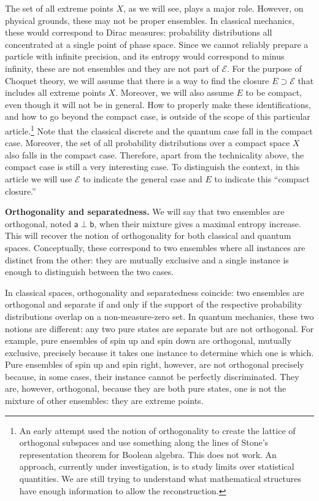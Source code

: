 \documentclass[10pt,twocolumn, nofootinbib]{revtex4-2}
\newcommand{\ens}[1][e] {\mathsf{#1}} %
\newcommand{\Ens}[1][E] {\mathcal{#1}} %
\def\ortho{\perp}
\begin{document}
The set of all extreme points $X$, as we will see, plays a major role. However, on physical grounds, these may not be proper ensembles. In classical mechanics, these would correspond to Dirac measures: probability distributions all concentrated at a single point of phase space. Since we cannot reliably prepare a particle with infinite precision, and its entropy would correspond to minus infinity, these are not ensembles and they are not part of $\Ens$. For the purpose of Choquet theory, we will assume that there is a way to find the closure $E \supset \Ens$ that includes all extreme points $X$. Moreover, we will also assume $E$ to be compact, even though it will not be in general. How to properly make these identifications, and how to go beyond the compact case, is outside of the scope of this particular article.\footnote{An early attempt used the notion of orthogonality to create the lattice of orthogonal subspaces and use something along the lines of Stone's representation theorem for Boolean algebra. This does not work. An approach, currently under investigation, is to study limits over statistical quantities. We are still trying to understand what mathematical structures have enough information to allow the reconstruction.} Note that the classical discrete and the quantum case fall in the compact case. Moreover, the set of all probability distributions over a compact space $X$ also falls in the compact case. Therefore, apart from the technicality above, the compact case is still a very interesting case. To distinguish the context, in this article we will use $\Ens$ to indicate the general case and $E$ to indicate this ``compact closure.''

\textbf{Orthogonality and separatedness.} We will say that two ensembles are orthogonal, noted $\ens[a] \ortho \ens[b]$, when their mixture gives a maximal entropy increase. This will recover the notion of orthogonality for both classical and quantum spaces. Conceptually, these correspond to two ensembles where all instances are distinct from the other: they are mutually exclusive and a single instance is enough to distinguish between the two cases. 

In classical spaces, orthogonality and separatedness coincide: two ensembles are orthogonal and separate if and only if the support of the respective probability distributions overlap on a non-measure-zero set. In quantum mechanics, these two notions are different: any two pure states are separate but are not orthogonal. For example, pure ensembles of spin up and spin down are orthogonal, mutually exclusive, precisely because it takes one instance to determine which one is which. Pure ensembles of spin up and spin right, however, are not orthogonal precisely because, in some cases, their instance cannot be perfectly discriminated. They are, however, orthogonal, because they are both pure states, one is not the mixture of other ensembles: they are extreme points.
\end{document}
